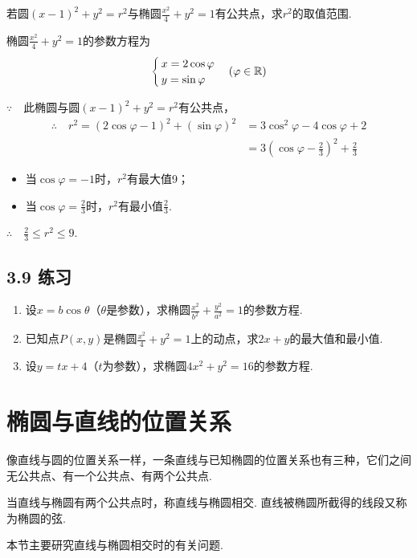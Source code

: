 \begin{example}
    若圆$(x-1)^2+y^2=r^2$与椭圆$\frac{x^2}{4}+y^2=1$有公共点，求$r^2$的取值范围.
\end{example}

\begin{solution}
椭圆$\frac{x^2}{4}+y^2=1$的参数方程为
\[\begin{cases}
    x=2\cos\varphi\\
    y=\sin\varphi
\end{cases}(\varphi\in\mathbb{R})\]

$\because\quad $此椭圆与圆$(x-1)^2+y^2=r^2$有公共点，
\[\begin{split}
    \therefore\quad r^2=(2\cos\varphi -1)^2+(\sin\varphi)^2&=3\cos^2\varphi-4\cos\varphi+2\\
&=3\left(\cos\varphi-\frac{2}{3}\right)^2+\frac{2}{3}
\end{split}\]
\begin{itemize}
    \item 当$\cos\varphi=-1$时，$r^2$有最大值9；
    \item 当$\cos\varphi=\frac{2}{3}$时，$r^2$有最小值$\frac{2}{3}$.
\end{itemize}

$\therefore\quad \frac{2}{3}\le r^2\le 9$.
\end{solution}

\subsection*{3.9 练习}
\begin{enumerate}
\item 设$x=b\cos\theta$（$\theta$是参数），求椭圆$\frac{x^2}{b^2}+\frac{y^2}{a^2}=1$的参数方程.
\item 已知点$P(x,y)$是椭圆$\frac{x^2}{4}+y^2=1$上的动点，求$2x+y$的最大值和最小值.
\item 设$y=tx+4$（$t$为参数），求椭圆$4x^2+y^2=16$的参数方程.
\end{enumerate}

\section{椭圆与直线的位置关系}
像直线与圆的位置关系一样，一条直线与已知椭圆的位置关系也有三种，它们之间无公共点、有一个公共点、有两个公共点.

当直线与椭圆有两个公共点时，称直线与椭圆相交. 直线被椭圆所截得的线段又称为椭圆的弦.

本节主要研究直线与椭圆相交时的有关问题.



